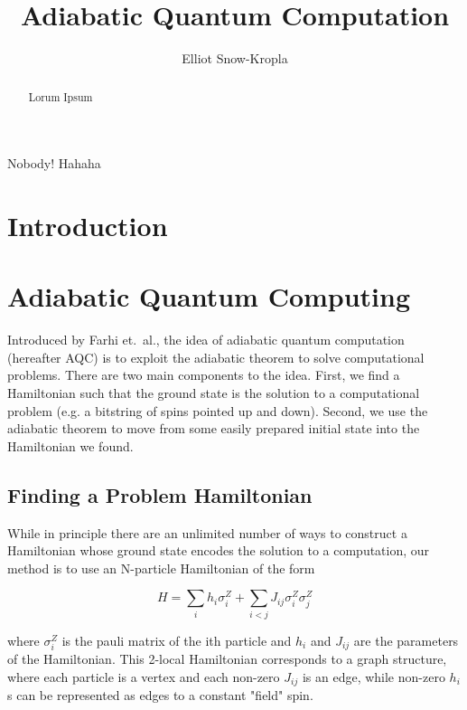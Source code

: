 \documentclass[12pt]{dalthesis}
\begin{document}
\title{Adiabatic Quantum Computation}
\author{Elliot Snow-Kropla}



\frontmatter

\begin{abstract}
	Lorum Ipsum
\end{abstract}

\begin{acknowledgements}
	Nobody! Hahaha
\end{acknowledgements}

\mainmatter

\chapter{Introduction}

\chapter{Adiabatic Quantum Computing}
Introduced by Farhi et.\ al.\cite{farhi}, the idea of adiabatic quantum computation (hereafter AQC) is to exploit the adiabatic theorem to solve computational problems.  There are two main components to the idea.  First, we find a Hamiltonian such that the ground state is the solution to a computational problem (e.g. a bitstring of spins pointed up and down).  Second, we use the adiabatic theorem to move from some easily prepared initial state into the Hamiltonian we found.

\section{Finding a Problem Hamiltonian}
While in principle there are an unlimited number of ways to construct a Hamiltonian whose ground state encodes the solution to a computation, our method is to use an N-particle Hamiltonian of the form

\begin{displaymath}
	H = \sum_{i} h_i \sigma_i^Z + \sum_{i < j} J_{ij} \sigma_i^Z\sigma_j^Z
\end{displaymath}

where $\sigma_i^Z$ is the pauli matrix of the ith particle and $h_i$ and $J_{ij}$ are the parameters of the Hamiltonian.  This 2-local Hamiltonian corresponds to a graph structure, where each particle is a vertex and each non-zero $J_{ij}$ is an edge, while non-zero $h_i$s can be represented as edges to a constant "field" spin.
\end{document}
